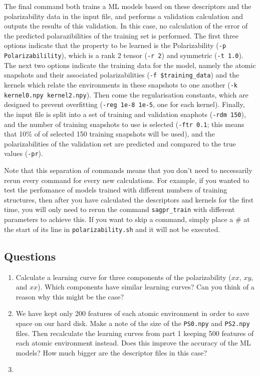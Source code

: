 \documentclass{article}
\begin{document}
The final command both trains a ML models based on these descriptors and the polarizability data in the input file, and performs a validation calculation and outputs the results of this validation. In this case, no calculation of the error of the predicted polarazibilities of the training set is performed. The first three options indicate that the property to be learned is the Polarizability (\verb|-p Polarizabilility|), which is a rank 2 tensor (\verb|-r 2|) and symmetric (\verb|-t 1.0|). The next two options indicate the training data for the model, namely the atomic snapshots and their associated polarizabilities (\verb|-f $training_data|) and the kernels which relate the environments in these snapshots to one another (\verb|-k kernel0.npy kernel2.npy|). Then come the regularisation constants, which are designed to prevent overfitting (\verb|-reg 1e-8 1e-5|, one for each kernel). Finally, the input file is split into a set of training and validation snaphots (\verb|-rdm 150|), and the number of training snapshots to use is selected (\verb|-ftr 0.1|; this means that 10\% of of selected 150 training snapshots will be used), and the polarizabilities of the validation set are predicted and compared to the true values (\verb|-pr|).

Note that this separation of commands means that you don't need to necessarily rerun every command for every new calculations. For example, if you wanted to test the perfomance of models trained with different numbers of training structures, then after you have calculated the descriptors and kernels for the first time, you will only need to rerun the command \verb|sagpr_train| with different parameters to achieve this. If you want to skip a command, simply place a \# at the start of its line in \verb|polarizability.sh| and it will not be executed.

\subsection*{Questions}

\begin{enumerate}

\item Calculate a learning curve for three components of the polarizability ($xx$, $xy$, and $xx$). Which components have similar learning curves? Can you think of a reason why this might be the case?
\item We have kept only 200 features of each atomic environment in order to save space on our hard disk. Make a note of the size of the \verb|PS0.npy| and \verb|PS2.npy| files. Then recalculate the learning curves from part 1 keeping 500 features of each atomic environment instead. Does this improve the accuracy of the ML models? How much bigger are the descriptor files in this case?
\item

\end{enumerate}
\end{document}
